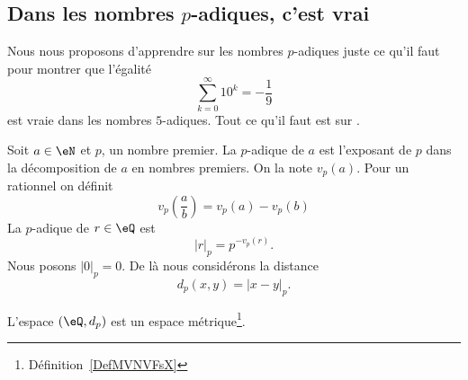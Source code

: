 \subsection{Dans les nombres \texorpdfstring{\( p\)}{p}-adiques, c'est vrai}

Nous nous proposons d'apprendre sur les nombres \( p\)-adiques juste ce qu'il faut pour montrer que l'égalité
\begin{equation}
	\sum_{k=0}^{\infty}10^k=-\frac{1}{ 9 }
\end{equation}
est vraie dans les nombres \( 5\)-adiques. Tout ce qu'il faut est sur .

Soit \( a\in \eN\) et \( p\), un nombre premier. La  \( p\)-adique de \( a\) est l'exposant de \( p\) dans la décomposition de \( a\) en nombres premiers. On la note \( v_p(a)\). Pour un rationnel on définit
\begin{equation}
	v_p\left( \frac{ a }{ b } \right)=v_p(a)-v_p(b)
\end{equation}
La  \( p\)-adique de \( r\in \eQ\) est
\begin{equation}
	| r |_p=p^{-v_p(r)}.
\end{equation}
Nous posons \( | 0 |_p=0\). De là nous considérons la distance
\begin{equation}
	d_p(x,y)=| x-y |_p.
\end{equation}

\begin{lemma}		\label{LEMooQNHZooXlHdUc}
	L'espace \( (\eQ,d_p)\) est un espace métrique\footnote{Définition~\ref{DefMVNVFsX}}.
\end{lemma}

